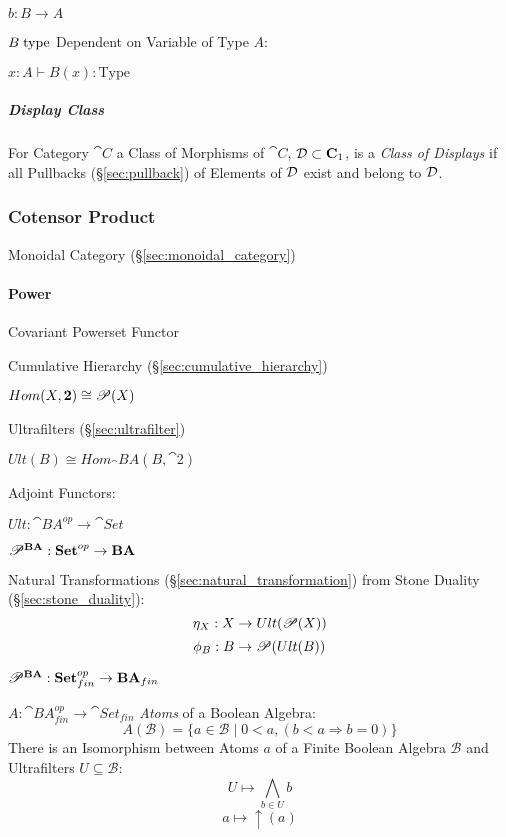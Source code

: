 $b : B \rightarrow A$

$B \;\mathrm{type}$ Dependent on Variable of Type $A$:

$x:A \vdash B(x):\mathrm{Type}$



\subparagraph{Display Class}\label{sec:display_class}\hfill

For Category $\cat{C}$ a Class of Morphisms of $\cat{C}$, $\mathcal{D}
\subset \mathbf{C}_1$, is a \emph{Class of Displays} if all Pullbacks
(\S\ref{sec:pullback}) of Elements of $\mathcal{D}$ exist and belong to
$\mathcal{D}$.



\subsubsection{Cotensor Product}\label{sec:cotensor_product}

Monoidal Category (\S\ref{sec:monoidal_category})



\paragraph{Power}\label{sec:power}\hfill

Covariant Powerset Functor %

Cumulative Hierarchy (\S\ref{sec:cumulative_hierarchy})

$Hom(X,\mathbf{2}) \cong \mathscr{P}(X)$

Ultrafilters (\S\ref{sec:ultrafilter})

$Ult(B) \cong Hom_\cat{BA}(B,\cat{2})$

Adjoint Functors:

$Ult : \cat{BA}^{op} \rightarrow \cat{Set}$

$\mathscr{P}^\mathbf{BA} : \mathbf{Set}^{op} \rightarrow \mathbf{BA}$

Natural Transformations (\S\ref{sec:natural_transformation}) from
Stone Duality (\S\ref{sec:stone_duality}):
\[
  \eta_X : X \rightarrow Ult(\mathscr{P}(X))
\]\[
  \phi_B : B \rightarrow \mathscr{P}(Ult(B))
\]

$\mathscr{P}^\mathbf{BA} :
  \mathbf{Set}^{op}_{fin} \rightarrow \mathbf{BA}_{fin}$

$A : \cat{BA}^{op}_{fin} \rightarrow \cat{Set}_{fin}$
\emph{Atoms} of a Boolean Algebra:
\[
  A(\mathcal{B}) = \{ a \in \mathcal{B} \;|\;
    0 < a, (b < a \Rightarrow b = 0) \}
\]
There is an Isomorphism between Atoms $a$ of a Finite Boolean Algebra
$\mathcal{B}$ and Ultrafilters $U \subseteq \mathcal{B}$:
\[
  U \mapsto \bigwedge_{b \in U} b
\]\[
  a \mapsto \uparrow (a)
\]



